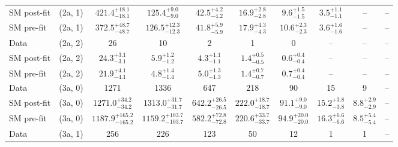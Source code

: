 \begin{table}[h!]
{\begin{tabular}{lccccccccc}
	SM post-fit & (2a, 1)           & $421.4^{+ 18.1 }_{- 18.1 }$    & $125.4^{+ 9.0 }_{- 9.0 }$      & $42.5^{+ 4.2 }_{- 4.2 }$    & $16.9^{+ 2.8 }_{- 2.8 }$    & $9.6^{+ 1.5 }_{- 1.5 }$     & $3.5^{+ 1.1 }_{- 1.1 }$  & --                       & --           \\[0.5ex] 
	SM pre-fit  & (2a, 1)           & $372.5^{+ 48.7 }_{- 48.7 }$    & $126.5^{+ 12.3 }_{- 12.3 }$    & $41.8^{+ 5.9 }_{- 5.9 }$    & $17.9^{+ 4.3 }_{- 4.3 }$    & $10.6^{+ 2.3 }_{- 2.3 }$    & $3.6^{+ 1.6 }_{- 1.6 }$  & --                       & --           \\[0.5ex] 
	Data        & (2a, 2)           & 26                             & 10                             & 2                           & 1                           & 0                           & --                       & --                       & --           \\[0.5ex] 
	SM post-fit & (2a, 2)           & $24.3^{+ 3.1 }_{- 3.1 }$       & $5.9^{+ 1.2 }_{- 1.2 }$        & $4.3^{+ 1.1 }_{- 1.1 }$     & $1.4^{+ 0.5 }_{- 0.5 }$     & $0.6^{+ 0.4 }_{- 0.4 }$     & --                       & --                       & --           \\[0.5ex] 
	SM pre-fit  & (2a, 2)           & $21.9^{+ 4.1 }_{- 4.1 }$       & $4.8^{+ 1.4 }_{- 1.4 }$        & $5.0^{+ 1.3 }_{- 1.3 }$     & $1.4^{+ 0.7 }_{- 0.7 }$     & $0.7^{+ 0.4 }_{- 0.4 }$     & --                       & --                       & --           \\[0.5ex] 
	Data        & (3a, 0)           & 1271                           & 1336                           & 647                         & 218                         & 90                          & 15                       & 9                        & --           \\[0.5ex] 
	SM post-fit & (3a, 0)           & $1271.0^{+ 34.2 }_{- 34.2 }$   & $1313.0^{+ 31.7 }_{- 31.7 }$   & $642.2^{+ 26.5 }_{- 26.5 }$ & $222.0^{+ 18.7 }_{- 18.7 }$ & $91.1^{+ 9.0 }_{- 9.0 }$    & $15.2^{+ 3.8 }_{- 3.8 }$ & $8.8^{+ 2.9 }_{- 2.9 }$  & --           \\[0.5ex] 
	SM pre-fit  & (3a, 0)           & $1187.9^{+ 165.2 }_{- 165.2 }$ & $1159.2^{+ 103.7 }_{- 103.7 }$ & $582.2^{+ 72.8 }_{- 72.8 }$ & $220.6^{+ 33.7 }_{- 33.7 }$ & $94.9^{+ 20.0 }_{- 20.0 }$  & $16.3^{+ 6.6 }_{- 6.6 }$ & $8.5^{+ 5.4 }_{- 5.4 }$  & --           \\[0.5ex] 
	Data        & (3a, 1)           & 256                            & 226                            & 123                         & 50                          & 12                          & 1                        & 1                        & --           \\[0.5ex] 

\end{tabular}}
\end{table}
